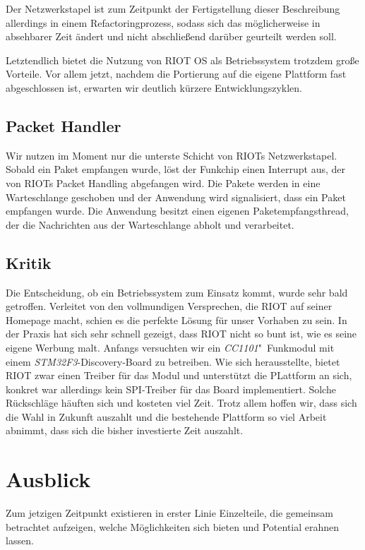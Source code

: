 \documentclass{IEEEtran}
\begin{document}
        Der Netzwerkstapel ist zum Zeitpunkt der Fertigstellung dieser
        Beschreibung allerdings in einem Refactoringprozess,
        sodass sich das möglicherweise in absehbarer Zeit ändert und nicht
        abschließend darüber geurteilt werden soll.

        Letztendlich bietet die Nutzung von RIOT OS als Betriebssystem trotzdem
        große Vorteile. Vor allem jetzt, nachdem die Portierung auf die eigene
        Plattform fast abgeschlossen ist, erwarten wir deutlich kürzere
        Entwicklungszyklen.

    \subsection{Packet Handler}
        Wir nutzen im Moment nur die unterste Schicht von RIOTs Netzwerkstapel.
        Sobald ein Paket empfangen wurde, löst der Funkchip einen Interrupt aus,
        der von RIOTs Packet Handling abgefangen wird. Die Pakete werden in eine
        Warteschlange geschoben und der Anwendung wird signalisiert,
        dass ein Paket empfangen wurde.
        Die Anwendung besitzt einen eigenen Paketempfangsthread,
        der die Nachrichten aus der Warteschlange abholt und verarbeitet.


    \subsection{Kritik}
        Die Entscheidung, ob ein Betriebssystem zum Einsatz kommt,
        wurde sehr bald getroffen. Verleitet von den vollmundigen Versprechen,
        die RIOT auf seiner Homepage macht, schien es die perfekte Lösung für
        unser Vorhaben zu sein. In der Praxis hat sich sehr schnell gezeigt,
        dass RIOT nicht so bunt ist, wie es seine eigene Werbung malt.
        Anfangs versuchten wir ein \emph{CC1101}"~Funkmodul mit einem
        \emph{STM32F3}-Discovery-Board zu betreiben. Wie sich herausstellte,
        bietet RIOT zwar einen Treiber für das Modul und unterstützt die
        PLattform an sich, konkret war allerdings kein SPI-Treiber für das Board
        implementiert. Solche Rückschläge häuften sich und kosteten viel Zeit.
        Trotz allem hoffen wir, dass sich die Wahl in Zukunft auszahlt und
        die bestehende Plattform so viel Arbeit abnimmt, dass sich die
        bisher investierte Zeit auszahlt.


\section{Ausblick}
    Zum jetzigen Zeitpunkt existieren in erster Linie Einzelteile,
    die gemeinsam betrachtet aufzeigen, welche Möglichkeiten sich bieten
    und Potential erahnen lassen.
\end{document}
